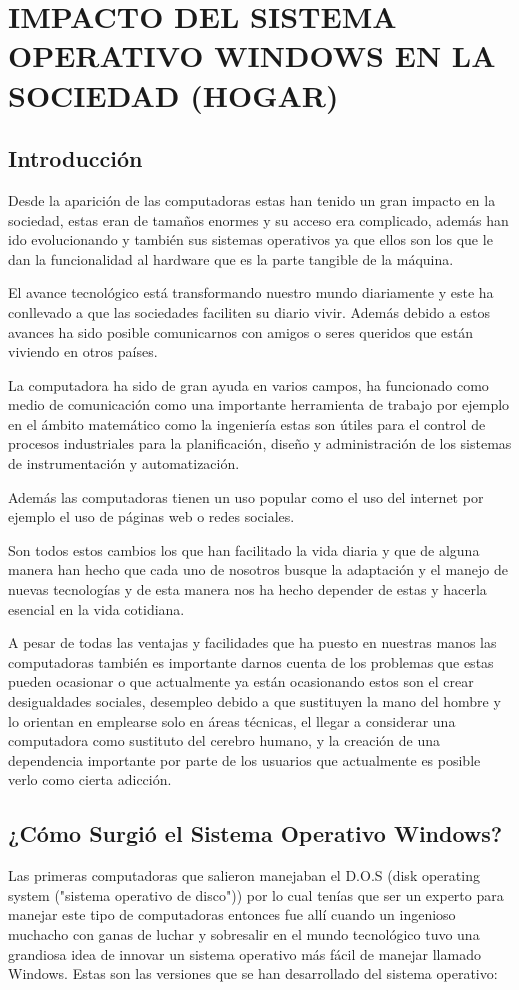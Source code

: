 \chapter*{IMPACTO DEL SISTEMA OPERATIVO WINDOWS EN LA SOCIEDAD (HOGAR)}
\section*{Introducción}
Desde la aparición de las computadoras estas han tenido un gran impacto en la sociedad, estas eran de tamaños enormes y su acceso era complicado, además han ido 
evolucionando y también sus sistemas operativos ya que ellos son los que le dan la funcionalidad al hardware que es la parte tangible de la máquina.

El avance tecnológico está transformando nuestro mundo diariamente y este ha conllevado a que las sociedades faciliten su diario vivir. Además debido a estos avances ha 
sido posible comunicarnos con amigos o seres queridos que están viviendo en otros países.

La computadora ha sido de gran ayuda en varios campos, ha funcionado como medio de comunicación como una importante herramienta de trabajo por ejemplo en el ámbito 
matemático como la ingeniería estas son útiles para el control de procesos industriales para la planificación, diseño y administración de los sistemas de instrumentación y 
automatización.
 
Además las computadoras tienen un uso popular como el uso del internet por ejemplo el uso de páginas web o redes sociales.

Son todos estos cambios los que han facilitado la vida diaria y que de alguna manera han hecho que cada uno de nosotros busque la adaptación y el manejo de nuevas 
tecnologías y de esta manera nos ha hecho depender de estas y hacerla esencial en la vida cotidiana.

A pesar de todas las ventajas y facilidades que ha puesto en nuestras manos las computadoras también es importante darnos cuenta de los problemas que estas pueden ocasionar 
o que actualmente ya están ocasionando estos son el crear desigualdades sociales, desempleo debido a que sustituyen la mano del hombre y lo orientan en emplearse solo en 
áreas técnicas, el llegar a considerar una computadora como sustituto del cerebro humano, y la creación de una dependencia importante por parte de los usuarios que 
actualmente es posible verlo como cierta adicción.


\section*{¿Cómo Surgió el Sistema Operativo Windows?}
Las primeras computadoras que salieron manejaban el D.O.S (disk operating system ("sistema operativo de disco")) por lo cual tenías que ser un experto para manejar este 
tipo de computadoras entonces fue allí cuando un ingenioso muchacho con ganas de luchar y sobresalir en el mundo tecnológico tuvo una grandiosa idea de innovar un sistema 
operativo más fácil de manejar llamado Windows.
Estas son las versiones que se han desarrollado del sistema operativo:

